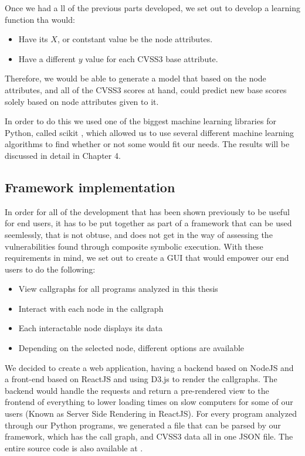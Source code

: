 Once we had a ll of the previous parts developed, we set out to develop a learning function tha would:

\begin{itemize}
	\item Have its $X$, or contstant value be the node attributes.
	\item Have a different $y$ value for each CVSS3 base attribute.
\end{itemize}

Therefore, we would be able to generate a model that based on the node attributes, and all of the CVSS3 scores at hand, could predict new base scores solely based on node attributes given to it.

In order to do this we used one of the biggest machine learning libraries for Python, called scikit \parencite{scikit}, which allowed us to use several different machine learning algorithms to find whether or not some would fit our needs. The results will be discussed in detail in Chapter 4.
\subsection{Framework implementation}

In order for all of the development that has been shown previously to be useful for end users, it has to be put together as part of a framework that can be used seemlessly, that is not obtuse, and does not get in the way of assessing the vulnerabilities found through composite symbolic execution. With these requirements in mind, we set out to create a GUI that would empower our end users to do the following:

\begin{itemize}
	\item View callgraphs for all programs analyzed in this thesis
	\item Interact with each node in the callgraph
	\item Each interactable node displays its data
	\item Depending on the selected node, different options are available
\end{itemize}

We decided to create a web application, having a backend based on NodeJS and a front-end based on ReactJS and using D3.js to render the callgraphs. The backend would handle the requests and return a pre-rendered view to the frontend of everything to lower loading times on slow computers for some of our users (Known as Server Side Rendering in ReactJS). For every program analyzed through our Python programs, we generated a file that can be parsed by our framework, which has the call graph, and CVSS3 data all in one JSON file. The entire source code is also available at \parencite{ricardo}.




